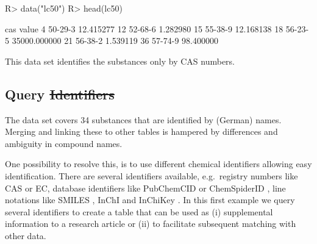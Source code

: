 \documentclass[article, shortnames]{jss}\usepackage[]{graphicx}\usepackage[]{color}
\providecommand{\DIFadd}[1]{{\protect\color{blue}\uwave{#1}}} %
\providecommand{\DIFdel}[1]{{\protect\color{red}\sout{#1}}}                      %
\providecommand{\DIFaddbegin}{} %
\providecommand{\DIFaddend}{} %
\providecommand{\DIFdelbegin}{} %
\providecommand{\DIFdelend}{} %
\begin{document}
\DIFdelbegin %
\DIFdelend \DIFaddbegin \begin{CodeChunk}
\begin{CodeInput}
R> data("lc50")
R> head(lc50)
\end{CodeInput}
\begin{CodeOutput}
       cas        value
4  50-29-3    12.415277
12 52-68-6     1.282980
15 55-38-9    12.168138
18 56-23-5 35000.000000
21 56-38-2     1.539119
36 57-74-9    98.400000
\end{CodeOutput}
\end{CodeChunk}
\DIFaddend 

This data set identifies the substances only by CAS numbers.


\DIFdelbegin %
\DIFdelend \DIFaddbegin \subsection[Query identifiers]{\DIFaddend Query \DIFdelbegin \DIFdel{Identifiers}\DIFdelend \DIFaddbegin \DIFadd{identifiers}\DIFaddend }
The  data set covers 34 substances that are identified by (German) names.
Merging and linking these to other tables is hampered by differences and ambiguity in compound names.

One possibility to resolve this, is to use different chemical identifiers allowing easy identification.
There are several identifiers available, e.g.\DIFaddbegin \  \DIFaddend registry numbers like CAS or EC, database identifiers like PubChemCID \citep{Kim_2016} or ChemSpiderID \citep{pence_chemspider:_2010}, line notations like SMILES \citep{Weininger_1990}, InChI and InChiKey \citep{Heller_McNaught_Pletnev_Stein_Tchekhovskoi_2015}. 
In this first example we query several identifiers to create a table that can be used as (i) supplemental information to a research article or (ii) to facilitate subsequent matching with other data.
\end{document}
